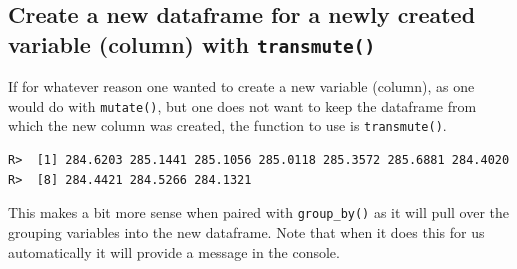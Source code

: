 \documentclass[]{book}
\newenvironment{Shaded}{\begin{snugshade}}{\end{snugshade}}
\newcommand{\KeywordTok}[1]{\textcolor[rgb]{0.13,0.29,0.53}{\textbf{#1}}}
\newcommand{\DataTypeTok}[1]{\textcolor[rgb]{0.13,0.29,0.53}{#1}}
\newcommand{\FloatTok}[1]{\textcolor[rgb]{0.00,0.00,0.81}{#1}}
\newcommand{\StringTok}[1]{\textcolor[rgb]{0.31,0.60,0.02}{#1}}
\newcommand{\OperatorTok}[1]{\textcolor[rgb]{0.81,0.36,0.00}{\textbf{#1}}}
\newcommand{\NormalTok}[1]{#1}
\theoremstyle{definition}
\theoremstyle{definition}
\theoremstyle{definition}
\theoremstyle{remark}
\begin{document}
\subsection{\texorpdfstring{Create a new dataframe for a newly created
variable (column) with
\texttt{transmute()}}{Create a new dataframe for a newly created variable (column) with transmute()}}\label{create-a-new-dataframe-for-a-newly-created-variable-column-with-transmute}

If for whatever reason one wanted to create a new variable (column), as
one would do with \texttt{mutate()}, but one does not want to keep the
dataframe from which the new column was created, the function to use is
\texttt{transmute()}.

\begin{Shaded}
\end{Shaded}

\begin{verbatim}
R>  [1] 284.6203 285.1441 285.1056 285.0118 285.3572 285.6881 284.4020
R>  [8] 284.4421 284.5266 284.1321
\end{verbatim}

This makes a bit more sense when paired with \texttt{group\_by()} as it
will pull over the grouping variables into the new dataframe. Note that
when it does this for us automatically it will provide a message in the
console.

\begin{Shaded}
\end{Shaded}
\end{document}
